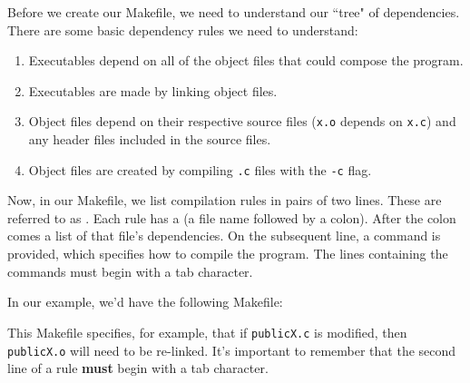 Before we create our Makefile, we need to understand our ``tree" of dependencies. There are some basic dependency rules we need to understand: \begin{enumerate}
    \item Executables depend on all of the object files that could compose the program.
    \item Executables are made by linking object files.
    \item Object files depend on their respective source files (\verb!x.o! depends on \verb!x.c!) and any header files included in the source files.
    \item Object files are created by compiling \verb!.c! files with the \verb!-c! flag. 
\end{enumerate}


Now, in our Makefile, we list compilation rules in pairs of two lines. These are referred to as . Each rule has a  (a file name followed by a colon). After the colon comes a list of that file's dependencies. On the subsequent line, a command is provided, which specifies how to compile the program. The lines containing the commands must begin with a tab character.

In our example, we'd have the following Makefile:

\lstset{
caption=Makefile 1
}
\begin{center}
\label{pointers:0601}
\end{center}

This Makefile specifies, for example, that if \verb!publicX.c! is modified, then \verb!publicX.o! will need to be re-linked. It's important to remember that the second line of a rule \textbf{must} begin with a tab character. 